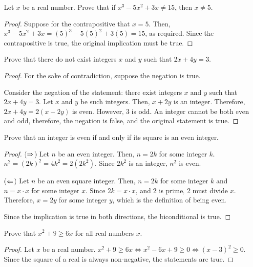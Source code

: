 \documentclass[11pt]{article}
\begin{document}
\question Let $x$ be a real number. Prove that if $x^3-5x^2+3x \neq 15$, then $x \neq 5$.
\begin{proof}
    Suppose for the contrapositive that $x=5$.
    Then, $x^3-5x^2+3x=(5)^3-5(5)^2+3(5)=15$, as required.
    Since the contrapositive is true, the original implication must be true.
\end{proof}


\question Prove that there do not exist integers $x$ and $y$ such that $2x + 4y = 3$.
\begin{proof}
    For the sake of contradiction, suppose the negation is true.
    
    Consider the negation of the statement: there exist integers $x$ and $y$ such that $2x + 4y = 3$.
    Let $x$ and $y$ be such integers.
    Then, $x+2y$ is an integer.
    Therefore, $2x+4y=2(x+2y)$ is even.
    However, 3 is odd.
    An integer cannot be both even and odd, therefore, the negation is false, and the original statement is true.
\end{proof}


\question Prove that an integer is even if and only if its square is an even integer.
\begin{proof}
    ($\Rightarrow$) Let $n$ be an even integer.
    Then, $n=2k$ for some integer $k$.
    $n^2=(2k)^2=4k^2=2(2k^2)$.
    Since $2k^2$ is an integer, $n^2$ is even.
    
    ($\Leftarrow$) Let $n$ be an even square integer.
    Then, $n=2k$ for some integer $k$ and $n=x\cdot x$ for some integer $x$.
    Since $2k=x\cdot x$, and 2 is prime, 2 must divide $x$.
    Therefore, $x=2y$ for some integer $y$, which is the definition of being even.
    
    Since the implication is true in both directions, the biconditional is true.
\end{proof}




\question Prove that $x^2 + 9 \geq 6x$ for all real numbers $x$.
\begin{proof}
    Let $x$ be a real number.
    $x^2+9 \geq 6x \iff x^2-6x+9 \geq 0 \iff (x-3)^2 \geq 0$.
    Since the square of a real is always non-negative, the statements are true.
\end{proof}
\end{document}
